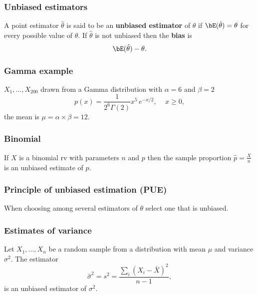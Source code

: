 \begin{frame}[fragile]\frametitle{Unbiased estimators}

\begin{defn}
A point estimator $\hat{\theta}$ is said to be 
an {\bf unbiased estimator} of $\theta$
if $\bE(\hat{\theta}) = \theta$ for
every possible value of $\theta$. If
$\hat{\theta}$ is not unbiased then 
the {\bf bias} is
$$\bE(\hat{\theta}) - \theta.$$

\end{defn}

\end{frame}


\begin{frame}[fragile]\frametitle{Gamma example}

$X_1,...,X_{200}$ drawn from a Gamma distribution with
$\alpha = 6$ and $\beta = 2$ 
$$p(x) = \frac{1}{2^6 \Gamma(2)} x^5 \, e^{-x/2}, \, \, \, \, \, \, \,
x \geq 0,$$
the mean is $\mu = \alpha \times \beta = 12$. 

\end{frame}



\begin{frame}[fragile]\frametitle{Binomial}

\begin{prop}

If $X$ is a binomial rv with parameters $n$ and $p$ then
the sample proportion $\hat{p} = \frac{X}{n}$ is an
unbiased estimate of $p$.

\end{prop}


\end{frame}




\begin{frame}[fragile]\frametitle{Principle of unbiased estimation (PUE)}

When choosing among several estimators of $\theta$ select
one that is unbiased.

\end{frame}


\begin{frame}[fragile]\frametitle{Estimates of variance}

\begin{prop}

Let $X_1,...,X_n$ be a random sample from a distribution
with mean $\mu$ and variance $\sigma^2$. The estimator
$$\hat{\sigma}^2 = s^2 = \frac{\sum_i(X_i-\bar{X})^2}{n-1},$$
is an unbiased estimator of $\sigma^2$.
\end{prop}
\end{frame}

